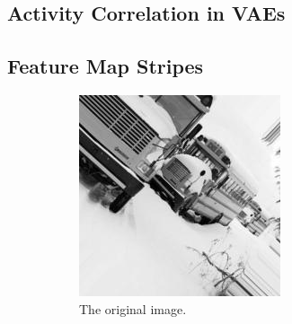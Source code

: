 \documentclass[11pt]{article}
\begin{document}
    \subsection{Activity Correlation in \acp{VAE}}\label{subsec:results_activity-correlation-in-vaes}

    \subsection{Feature Map Stripes}\label{subsec:feature-map-stripes}

    \begin{figure}
        \centering
        \begin{subfigure}{0.3\textwidth}
            \centering
            \includegraphics[width=\textwidth]{images/stripes/original.jpg}
            \caption{The original image.}
            \label{subfig:stripes_original}
        \end{subfigure}
        \hfill
        \begin{subfigure}{0.3\textwidth}
            \centering

\end{subfigure}
\end{figure}
\end{document}
